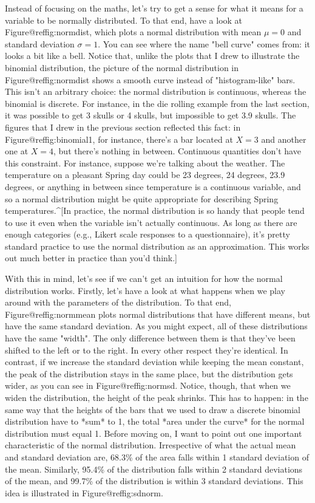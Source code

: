Instead of focusing on the maths, let's try to get a sense for what it means for a variable to be normally distributed. To that end, have a look at Figure@reffig:normdist, which plots a normal distribution with mean $\mu = 0$ and standard deviation $\sigma = 1$. You can see where the name "bell curve" comes from: it looks a bit like a bell. Notice that, unlike the plots that I drew to illustrate the binomial distribution, the picture of the normal distribution in Figure@reffig:normdist shows a smooth curve instead of "histogram-like" bars. This isn't an arbitrary choice: the normal distribution is continuous, whereas the binomial is discrete. For instance, in the die rolling example from the last section, it was possible to get 3 skulls or 4 skulls, but impossible to get 3.9 skulls. The figures that I drew in the previous section reflected this fact: in Figure@reffig:binomial1, for instance, there's a bar located at $X=3$ and another one at $X=4$, but there's nothing in between. Continuous quantities don't have this constraint. For instance, suppose we're talking about the weather. The temperature on a pleasant Spring day could be 23 degrees, 24 degrees, 23.9 degrees, or anything in between since temperature is a continuous variable, and so a normal distribution might be quite appropriate for describing Spring temperatures.^[In practice, the normal distribution is so handy that people tend to use it even when the variable isn't actually continuous. As long as there are enough categories (e.g., Likert scale responses to a questionnaire), it's pretty standard practice to use the normal distribution as an approximation. This works out much better in practice than you'd think.] 

With this in mind, let's see if we can't get an intuition for how the normal distribution works. Firstly, let's have a look at what happens when we play around with the parameters of the distribution. To that end, Figure@reffig:normmean plots normal distributions that have different means, but have the same standard deviation. As you might expect, all of these distributions have the same "width". The only difference between them is that they've been shifted to the left or to the right. In every other respect they're identical. In contrast, if we increase the standard deviation while keeping the mean constant, the peak of the distribution stays in the same place, but the distribution gets wider, as you can see in Figure@reffig:normsd. Notice, though, that when we widen the distribution, the height of the peak shrinks. This has to happen: in the same way that the heights of the bars that we used to draw a discrete binomial distribution have to *sum* to 1, the total *area under the curve* for the normal distribution must equal 1. Before moving on, I want to point out one important characteristic of the normal distribution. Irrespective of what the actual mean and standard deviation are, 68.3\% of the area falls within 1 standard deviation of the mean. Similarly, 95.4\% of the distribution falls within 2 standard deviations of the mean, and 99.7\% of the distribution is within 3 standard deviations. This idea is illustrated in Figure@reffig:sdnorm.

